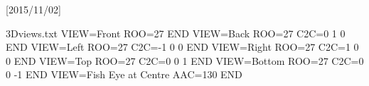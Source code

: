 
\usepackage{xcolor}

\usepackage{hyperref}
\usepackage[UKenglish]{babel}

\usepackage{media9}[2015/11/02]

\newcommand{\columnsbegin}{\begin{columns}}
\newcommand{\columnsend}{\end{columns}}

\newcommand{\col}[1]{\column{#1\textwidth}}


\usepackage[ruled,vlined,linesnumbered]{algorithm2e}




\usepackage{filecontents}
\begin{filecontents*}{3Dviews.txt}
VIEW=Front
  ROO=27
END
VIEW=Back
  ROO=27
  C2C=0 1 0
END
VIEW=Left
  ROO=27
  C2C=-1 0 0
END
VIEW=Right
  ROO=27
  C2C=1 0 0
END
VIEW=Top
  ROO=27
  C2C=0 0 1
END
VIEW=Bottom
  ROO=27
  C2C=0 0 -1
END
VIEW=Fish Eye at Centre
  AAC=130
END
\end{filecontents*}
